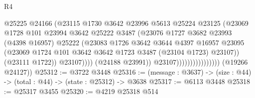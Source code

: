 \begin{lexlean}{R4}
\begin{coremodule}
                                            @25225
                                            @24166
                                            (@23115
                                              @1730
                                              @3642
                                              @23996
                                              @5613
                                              @25224
                                              @23125
                                              (@23069
                                                @1728
                                                @101
                                                @23994
                                                @3642
                                                @25222
                                                @3487
                                                (@23076
                                                  @1727
                                                  @3682
                                                  @23993
                                                  (@4398 @16957)
                                                  @25222
                                                  (@23083
                                                    @1726
                                                    @3642
                                                    @3644
                                                    @4397
                                                    @16957
                                                    @23095
                                                    (@23069
                                                      @1724
                                                      @101
                                                      @3642
                                                      @3642
                                                      @1723
                                                      @3487
                                                      (@23104 @1723)
                                                      @23107))
                                                  (@23111 @1722))
                                                @23107))))
                                        (@24188 @23991))
                                      @23107))))))))))))))))
      (@19266 @24127))
@25312 := @3722 @3448
@25316 := (message : @3637) -> (size : @44) -> (total : @44) -> (state : @25312) -> @3638
@25317 := @6113 @3448
@25318 := @25317 @3455
@25320 := @4219 @25318 @514

\end{coremodule}
\end{lexlean}
